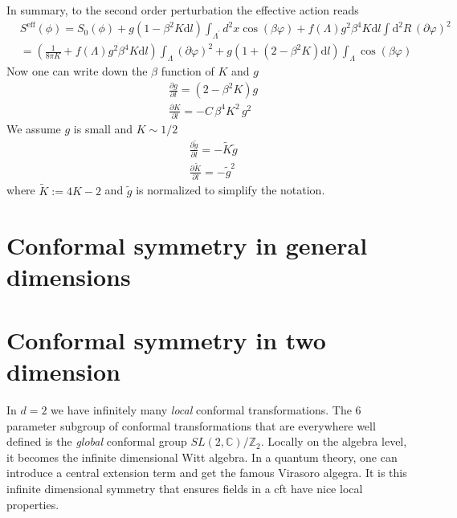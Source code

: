 \documentclass[submission, PhysLectNotes]{SciPost}
\begin{document}
In summary, to the second order perturbation the effective action reads
\begin{equation}
	\begin{aligned}
		&S^{\text{eff}} ( \phi  ) = S_0(\phi ) + g( 1 - \beta^2 K \text{d}l )\int_{\Lambda^\prime} d^2x \cos  (\beta  \varphi ) + f(\Lambda) g^2 \beta^4 K\mathrm{d}l \int \mathrm{d}^2R\,  \left(\partial \varphi\right)^2 \\ 
		&= \left(\frac{1}{8\pi K} + f(\Lambda) g^2 \beta^4 K\mathrm{d}l\right) \int_\Lambda \left( \partial \varphi \right)^2 + g\left(1 + \left(2-\beta^2 K\right)\mathrm{d}l\right)\int_\Lambda \cos (\beta \varphi)
	\end{aligned}
\end{equation}
Now one can write down the \(\beta\) function of \(K\) and \(g\)
\begin{equation}
	\begin{aligned}
		&\frac{\partial g}{\partial l}=(2-\beta^2 K)g\\
		&\frac{\partial K}{\partial l} = -C\,\beta^4 K^2\,g^2 		
	\end{aligned}
\end{equation}
We assume $g$ is small and $K \sim 1/2$
\begin{equation}
	\begin{aligned}
		&\frac{\partial \tilde{g}}{\partial l} = - \tilde{K} \tilde{g}\\
		&\frac{\partial \tilde{K}}{\partial l} = -\tilde{g}^2 		
	\end{aligned}
\end{equation}
where $\tilde{K} := 4 K - 2$ and $\tilde{g}$ is normalized to simplify the notation.
 

\section{Conformal symmetry in general dimensions}

\section{Conformal symmetry in two dimension}
In $d=2$ we have infinitely many \emph{local} conformal transformations. The 6 parameter subgroup of conformal transformations that are everywhere well defined is the \emph{global} conformal group $SL(2,\mathbb{C})/\mathbb{Z}_2$. Locally on the algebra level, it becomes the infinite dimensional Witt algebra. In a quantum theory, one can introduce a central extension term and get the famous Virasoro algegra. It is this infinite dimensional symmetry that ensures fields in a cft have nice local properties.
\end{document}
